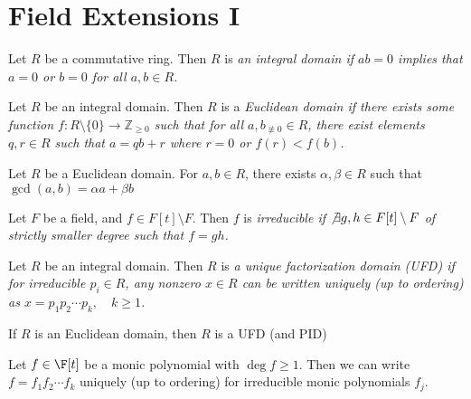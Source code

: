 \documentclass[a4paper]{article}
\begin{document}
\section{Field Extensions I}
\begin{tdefinition}
  Let \( R \) be a commutative ring. Then \( R \) is \it{an integral domain} if \( ab=0 \) implies that \( a=0 \) or \( b=0 \) for all \( a,b\in R \).
\end{tdefinition}

\begin{tdefinition}
  Let \( R \) be an integral domain. Then \( R \) is a \it{Euclidean domain} if there exists some function \( f:R\setminus\{0\}\to \mathbb{Z}_{\geq 0} \) such that for all \( a,b_{\not\equiv 0} \in R \), there exist elements \( q,r\in R \) such that \( a=qb+r \) where \( r=0 \) or \( f(r)<f(b) \).
\end{tdefinition}

\begin{ttheorem}
  Let \( R \) be a Euclidean domain. For \( a,b\in R \), there exists \( \alpha,\beta\in R \) such that \( \gcd(a,b) = \alpha a+\beta b \)
\end{ttheorem}

\begin{tdefinition}[Irreducible]
  Let \( {F} \) be a field, and \( f\in F[t]\setminus F \).
  Then \( f \) is \it{irreducible} if \( \not\exists g,h\in F[t]\setminus F \) of strictly smaller degree such that \( f=gh \).
\end{tdefinition}

\begin{tdefinition}
  Let \( R \) be an integral domain.
  Then \( R \) is \it{a unique factorization domain (UFD)} if for irreducible \( p_i\in R \), any nonzero \( x\in R \) can be written uniquely (up to ordering) as \( x=p_1p_2\cdots p_k,\quad k\geq 1 \).
\end{tdefinition}

\quad If \( R \) is an Euclidean domain, then \( R \) is a UFD (and PID)

\begin{tcorollary}
  Let \( f\in \F[t] \) be a monic polynomial with \( \deg f\geq 1 \).
  Then we can write \( f = f_1f_2\cdots f_k \) uniquely (up to ordering) for irreducible monic polynomials \( f_j \).
\end{tcorollary}
\end{document}
